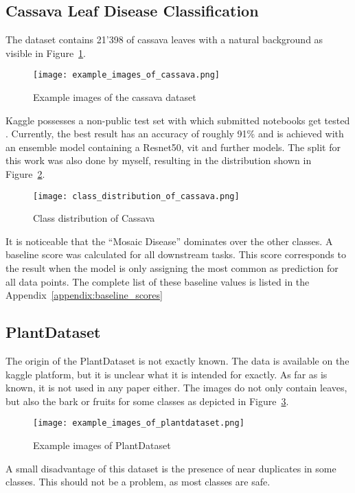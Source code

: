 \subsection{Cassava Leaf Disease Classification}
The dataset contains 21'398 of cassava leaves with a natural background as visible in Figure~\ref{fig:example_images_of_cassava}.
\begin{figure}[H]
    \begin{center}
    \texttt{[image: example\_images\_of\_cassava.png]}
    \caption{Example images of the cassava dataset}\label{fig:example_images_of_cassava}
    \end{center}
\end{figure}
Kaggle possesses a non-public test set with which submitted notebooks get tested \autocite{mwebaze2020}. 
Currently, the best result has an accuracy of roughly 91\% and is achieved with an ensemble model containing a Resnet50, \gls{vit} and further models.  
The split for this work was also done by myself, resulting in the distribution shown in Figure~\ref{fig:class_distribution_of_cassava}.
\begin{figure}[H]
    \begin{center}
    \texttt{[image: class\_distribution\_of\_cassava.png]}
    \caption{Class distribution of Cassava}\label{fig:class_distribution_of_cassava}
    \end{center}
\end{figure}
It is noticeable that the ``Mosaic Disease'' dominates over the other classes. 
A baseline score was calculated for all downstream tasks. 
This score corresponds to the result when the model is only assigning the most common as prediction for all data points. 
The complete list of these baseline values is listed in the Appendix~\ref{appendix:baseline_scores}

\subsection{PlantDataset}
The origin of the PlantDataset is not exactly known. The data is available on the kaggle platform, but it is unclear what it is intended for exactly. 
As far as is known, it is not used in any paper either.
The images do not only contain leaves, but also the bark or fruits for some classes as depicted in Figure~\ref{fig:example_images_of_plantdataset}.
\begin{figure}[H]
    \begin{center}
    \texttt{[image: example\_images\_of\_plantdataset.png]}
    \caption{Example images of PlantDataset}\label{fig:example_images_of_plantdataset}
    \end{center}
\end{figure}
A small disadvantage of this dataset is the presence of near duplicates in some classes. This should not be a problem, as most classes are safe.

